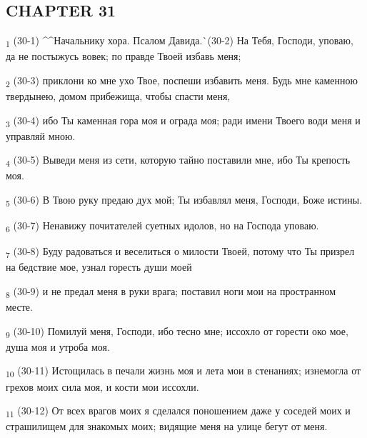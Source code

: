 \subsection{CHAPTER 31}
\begin{tcolorbox}
\textsubscript{1} (30-1) ^^Начальнику хора. Псалом Давида.^^ (30-2) На Тебя, Господи, уповаю, да не постыжусь вовек; по правде Твоей избавь меня;
\end{tcolorbox}
\begin{tcolorbox}
\textsubscript{2} (30-3) приклони ко мне ухо Твое, поспеши избавить меня. Будь мне каменною твердынею, домом прибежища, чтобы спасти меня,
\end{tcolorbox}
\begin{tcolorbox}
\textsubscript{3} (30-4) ибо Ты каменная гора моя и ограда моя; ради имени Твоего води меня и управляй мною.
\end{tcolorbox}
\begin{tcolorbox}
\textsubscript{4} (30-5) Выведи меня из сети, которую тайно поставили мне, ибо Ты крепость моя.
\end{tcolorbox}
\begin{tcolorbox}
\textsubscript{5} (30-6) В Твою руку предаю дух мой; Ты избавлял меня, Господи, Боже истины.
\end{tcolorbox}
\begin{tcolorbox}
\textsubscript{6} (30-7) Ненавижу почитателей суетных идолов, но на Господа уповаю.
\end{tcolorbox}
\begin{tcolorbox}
\textsubscript{7} (30-8) Буду радоваться и веселиться о милости Твоей, потому что Ты призрел на бедствие мое, узнал горесть души моей
\end{tcolorbox}
\begin{tcolorbox}
\textsubscript{8} (30-9) и не предал меня в руки врага; поставил ноги мои на пространном месте.
\end{tcolorbox}
\begin{tcolorbox}
\textsubscript{9} (30-10) Помилуй меня, Господи, ибо тесно мне; иссохло от горести око мое, душа моя и утроба моя.
\end{tcolorbox}
\begin{tcolorbox}
\textsubscript{10} (30-11) Истощилась в печали жизнь моя и лета мои в стенаниях; изнемогла от грехов моих сила моя, и кости мои иссохли.
\end{tcolorbox}
\begin{tcolorbox}
\textsubscript{11} (30-12) От всех врагов моих я сделался поношением даже у соседей моих и страшилищем для знакомых моих; видящие меня на улице бегут от меня.
\end{tcolorbox}
